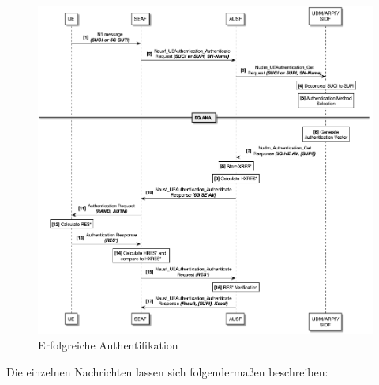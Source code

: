\begin{figure}[H]
  \centering
  \includegraphics[width=\textwidth]{uml/protocol_v1.png}
  \caption{Erfolgreiche Authentifikation}
  \label{fig:protocol_v1}
\end{figure}

Die einzelnen Nachrichten lassen sich folgenderma{\ss}en beschreiben: %

